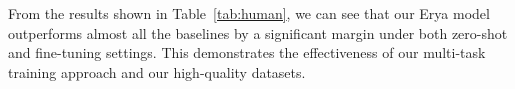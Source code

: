 From the results shown in Table~\ref{tab:human}, we can see that our Erya model outperforms almost all the baselines by a significant margin under both zero-shot and fine-tuning settings. This demonstrates the effectiveness of our multi-task training approach and our high-quality datasets.


\begin{table}[htbp]
\caption{\textbf{Human evaluation on Erya benchmark.}}
\label{tab:human}
\centering
\small

\end{table}





